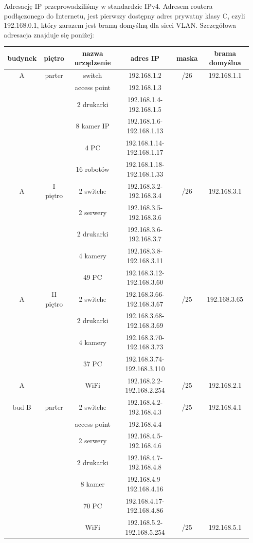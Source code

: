 \documentclass{article}
\begin{document}
Adresację IP przeprowadziliśmy w standardzie IPv4. Adresem routera podłączonego do Internetu, jest pierwszy dostępny adres prywatny klasy C, czyli 192.168.0.1, który zarazem jest bramą domyślną dla sieci VLAN.
Szczegółowa adresacja znajduje się poniżej:

	\begin{tabular}[!ht]{c|c|c|c|c|c}
	budynek &	piętro &	nazwa urządzenie & adres IP &maska&brama domyślna\\
	\hline
	A	& parter &	switch & 192.168.1.2&/26&192.168.1.1\\
	& &access point	& 192.168.1.3&&\\
	& &2 drukarki	& 192.168.1.4-192.168.1.5&&\\
	& & 8 kamer IP &	192.168.1.6-192.168.1.13&&\\
	& & 4 PC	& 192.168.1.14-192.168.1.17&&\\
	& & 16  robotów &	192.168.1.18-192.168.1.33&&\\ \hline
	
	A&I piętro	&2 switche	&192.168.3.2-192.168.3.4&/26&192.168.3.1\\
	&&2 serwery	&192.168.3.5-192.168.3.6&&\\
	&&2 drukarki&	192.168.3.6-192.168.3.7&&\\
	&&4 kamery	&192.168.3.8-192.168.3.11&&\\
	&&49 PC	&192.168.3.12-192.168.3.60&&\\
	\hline
	
	A &II piętro&	2 switche&	192.168.3.66-192.168.3.67&/25&192.168.3.65\\
	&&2 drukarki	&192.168.3.68-192.168.3.69&&\\
	&&4 kamery	&192.168.3.70-192.168.3.73&&\\
	&&37 PC	&192.168.3.74-192.168.3.110&&\\
	\hline
	A & &	WiFi	 &192.168.2.2-192.168.2.254&/25&192.168.2.1\\
	\hline
\hline

bud B &	parter&2 switche&	192.168.4.2-192.168.4.3&/25&192.168.4.1\\
&& access point	&192.168.4.4&&\\
&&2 serwery	&192.168.4.5-192.168.4.6&&\\
&&2 drukarki&	192.168.4.7-192.168.4.8&&\\
&&8 kamer	&192.168.4.9-192.168.4.16&&\\
&&70 PC	&192.168.4.17-192.168.4.86&&\\
\hline
&&WiFi &	192.168.5.2-192.168.5.254&/25&192.168.5.1\\
\hline

\end{tabular}
\newpage
\end{document}
